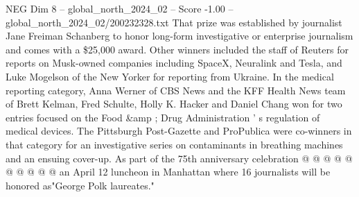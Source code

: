 \begin{textsample}{NEG Dim 8 – global\_north\_2024\_02 – Score -1.00 – global\_north\_2024\_02/200232328.txt}
That prize was established by journalist Jane Freiman Schanberg to honor long-form investigative or enterprise journalism and comes with a \$25,000 award.
Other winners included the staff of Reuters for reports on Musk-owned companies including SpaceX, Neuralink and Tesla, and Luke Mogelson of the New Yorker for reporting from Ukraine.
In the medical reporting category, Anna Werner of CBS News and the KFF Health News team of Brett Kelman, Fred Schulte, Holly K.
Hacker and Daniel Chang won for two entries focused on the Food \&amp ; Drug Administration ' s regulation of medical devices.
The Pittsburgh Post-Gazette and ProPublica were co-winners in that category for an investigative series on contaminants in breathing machines and an ensuing cover-up.
As part of the 75th anniversary celebration @ @ @ @ @ @ @ @ @ @ an April 12 luncheon in Manhattan where 16 journalists will be honored as"George Polk laureates."

\end{textsample}
